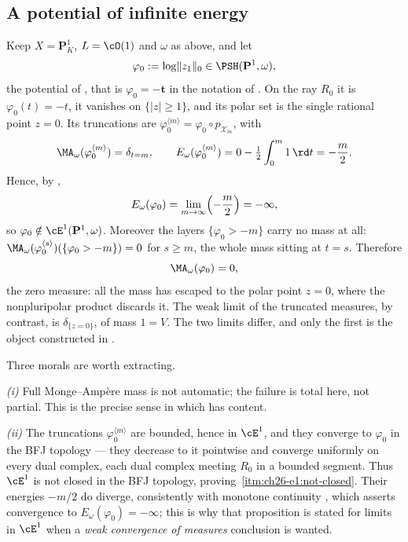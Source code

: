 \subsection{A potential of infinite energy}
\label{sec:ch26-ex-infinite}

\begin{example}
\label{ex:ch26-infinite-energy}
Keep \(X=\mathbf P^1_K\), \(L=\cO(1)\) and \(\omega\) as above, and let
\[
 \varphi_0:=\log\lVert z_1\rVert_0\in\PSH(\mathbf P^1,\omega),
\]
the potential of , that is
\(\varphi_0=-\mathbf t\) in the notation of
.  On the ray \(R_0\) it is
\(\varphi_0(t)=-t\), it vanishes on \(\{|z|\geq1\}\), and its polar set is
the single rational point \(z=0\).  Its truncations are
\(\varphi_0^{\langle m\rangle}=\varphi_0\circ p_{\mathcal X_m}\), with
\[
 \MA_\omega(\varphi_0^{\langle m\rangle})=\delta_{t=m},
 \qquad
 E_\omega(\varphi_0^{\langle m\rangle})
 =0-\tfrac12\int_0^m1\,\rd t=-\frac m2 .
\]
Hence, by ,
\begin{equation}
\label{eq:ch26-infinite-energy}
 E_\omega(\varphi_0)=\lim_{m\to\infty}\Bigl(-\frac m2\Bigr)=-\infty,
\end{equation}
so \(\varphi_0\notin\cE^1(\mathbf P^1,\omega)\).  Moreover the layers
\(\{\varphi_0>-m\}\) carry no mass at all:
\(\MA_\omega(\varphi_0^{\langle s\rangle})(\{\varphi_0>-m\})=0\) for
\(s\geq m\), the whole mass sitting at \(t=s\).  Therefore
\begin{equation}
\label{eq:ch26-zero-npp-mass}
 \MA_\omega(\varphi_0)=0,
\end{equation}
the zero measure: all the mass has escaped to the polar point \(z=0\), where
the nonpluripolar product discards it.  The weak limit of the truncated
measures, by contrast, is \(\delta_{\{z=0\}}\), of mass \(1=V\).  The two
limits differ, and only the first is the object constructed in
.

Three morals are worth extracting.

\emph{(i)}  Full Monge--Amp\`ere mass is not automatic; the failure is total
here, not partial.  This is the precise sense in which
 has content.

\emph{(ii)}  The truncations \(\varphi_0^{\langle m\rangle}\) are bounded,
hence in \(\cE^1\), and they converge to \(\varphi_0\) in the BFJ topology
--- they decrease to it pointwise and converge uniformly on every dual
complex, each dual complex meeting \(R_0\) in a bounded segment.  Thus
\(\cE^1\) is not closed in the BFJ topology, proving
\,\cref{itm:ch26-e1:not-closed}.  Their energies
\(-m/2\) do diverge, consistently with monotone continuity
, which asserts convergence to
\(E_\omega(\varphi_0)=-\infty\); this is why that proposition is stated for
limits in \(\cE^1\) when a \emph{weak convergence of measures} conclusion is
wanted.


\end{example}
